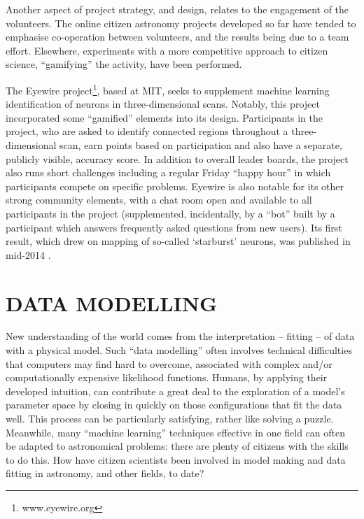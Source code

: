 \documentclass{ar2e}
\begin{document}


Another aspect of project strategy, and design, relates to the engagement of the
volunteers. The online citizen astronomy projects developed so far have tended
to emphasise co-operation between volunteers, and the results being due to a
team effort. Elsewhere, experiments with a more competitive approach to citizen
science, ``gamifying'' the activity, have been performed.

The Eyewire project\footnote{www.eyewire.org}, based at MIT, seeks to supplement machine learning
identification of neurons in three-dimensional scans. Notably, this project
incorporated some ``gamified'' elements into its design. Participants in the
project, who are asked to identify connected regions throughout a
three-dimensional scan, earn points based on participation and also have a
separate, publicly visible, accuracy score.  In addition to overall leader
boards, the project also runs short challenges including a regular Friday
``happy hour'' in which participants compete on specific problems. Eyewire is
also notable for its other strong community elements, with a chat room open and
available to all participants in the project (supplemented, incidentally, by a
``bot'' built by a participant which answers frequently asked questions from new
users). Its first result, which drew on mapping of so-called `starburst' neurons, was 
published in mid-2014 \citep{KimEyewire}.




\section{DATA MODELLING}
\label{sec:model}

New understanding of the world comes from the interpretation -- fitting -- of
data with a physical model. Such ``data modelling'' often involves technical
difficulties that computers may find hard to overcome, associated with complex
and/or computationally expensive likelihood functions. Humans, by applying their
developed intuition, can contribute a great deal to the exploration of a model's
parameter space by closing in quickly on those configurations that fit the data
well. This process can be particularly satisfying, rather like solving a puzzle.
Meanwhile, many ``machine learning'' techniques effective in one field can often
be adapted to astronomical problems: there are plenty of citizens with the
skills to do this. How have citizen scientists been involved in model making and
data fitting in astronomy, and other fields, to date?
\end{document}
